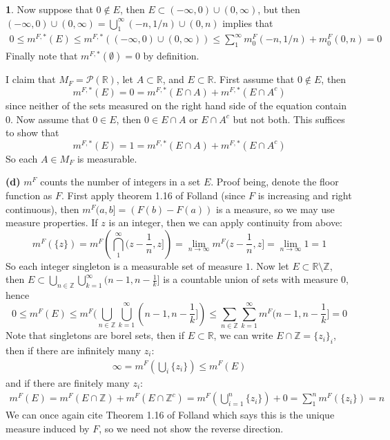 \documentclass[10.5pt]{article}
\theoremstyle{definition}
\newtheorem{pb}{}
\newcommand{\set}[1]{\{#1\}}
\newcommand{\tor}{\text{ or }}
\begin{document}
\begin{pb}
        Now suppose that \(0 \not \in E\), then \(E \subset (- \infty, 0) \cup (0,\infty)\), but then \((- \infty, 0) \cup (0,\infty) = \bigcup_1^\infty (-n, 1/n) \cup (0,n)\)
        implies that
        \begin{align*}
            0 \leq m^{F,*}(E) \leq m^{F,*}((- \infty, 0) \cup (0,\infty)) 
            \leq \sum_1^\infty m^F_0(-n, 1/n) + m^F_0(0,n) = 0
        \end{align*}
        Finally note that \(m^{F,*}(\emptyset) = 0\) by definition.

        I claim that \(M_F = \mathcal{P}(\mathbb{R})\), let \(A \subset \mathbb{R}\), and \(E \subset \mathbb{R}\). First assume that \(0 \not \in E\), then
        \[m^{F,*}(E) = 0 = m^{F,*}(E \cap A) + m^{F,*}(E \cap A^c)\]
        since neither of the sets measured on the right hand side of the equation contain 0. Now assume that \(0 \in E\), then \(0 \in E \cap A \tor E \cap A^c\) but not both.
        This suffices to show that
        \[m^{F,*}(E) = 1 = m^{F,*}(E \cap A) + m^{F,*}(E \cap A^c)\]
        So each \(A \in M_F\) is measurable.

        \textbf{(d)} \(m^F\) counts the number of integers in a set \(E\). Proof being, denote the floor function as \(F\).
        First apply theorem 1.16 of Folland (since \(F\) is increasing and right continuous), then \(m^F(a,b] = (F(b) - F(a))\) is a measure, so we may use measure properties.
        If \(z\) is an integer, then we can apply continuity from above:
        \[m^F(\set{z}) = m^F \left(\bigcap_1^\infty (z-\frac1n,z]\right) = \lim_{n\to\infty}m^F(z-\frac1n,z] = \lim_{n\to\infty}1 = 1\]
        So each integer singleton is a measurable set of measure \(1\). Now let \(E \subset \mathbb{R}\setminus\mathbb{Z}\), then \newline
        \(E \subset \bigcup_{n \in \mathbb{Z}}\bigcup_{k=1}^\infty(n-1,n-\frac{1}{k}]\) is a countable union of sets with measure \(0\), hence
        \[0 \leq m^F(E) \leq m^F (\bigcup_{n \in \mathbb{Z}}\bigcup_{k=1}^\infty(n-1,n-\frac{1}{k}]) \leq \sum_{n\in \mathbb{Z}}\sum_{k=1}^\infty m^F(n-1,n-\frac{1}{k}] = 0\]
        Note that singletons are borel sets, then if \(E \subset \mathbb{R}\), we can write \(E \cap \mathbb{Z} = \set{z_i}_i\), then if there are infinitely many \(z_i\):
        \begin{align*}
            \infty = m^F\left(\bigcup_i\set{z_i}\right) \leq m^F(E)
        \end{align*}
        and if there are finitely many \(z_i\):
        \begin{align*}
            m^F(E) = m^F\left(E \cap \mathbb{Z}\right) + m^F\left(E \cap \mathbb{Z}^c\right) = m^F\left(\bigcup_{i=1}^n \set{z_i}\right) + 0 = \sum_1^n m^F(\set{z_i}) = n
        \end{align*}
        We can once again cite Theorem 1.16 of Folland which says this is the unique measure induced by \(F\),  so we need not show the reverse direction.
    \end{pb}
\end{document}
